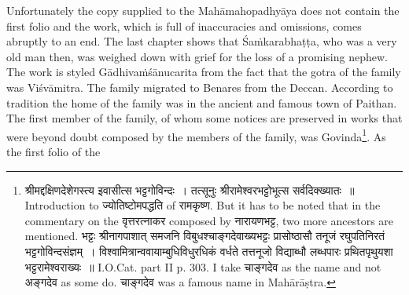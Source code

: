 \documentclass[11pt, openany]{book}
\begin{document}
Unfortunately the copy supplied to the Mahāmahopadhyāya does not contain the first folio and the work, which is full of inaccuracies and omissions, comes abruptly to an end. The last chapter shows that Śaṁkarabhaṭṭa, who was a very old man then, was weighed down with grief for the loss of a promising nephew. The work is styled Gādhivaṁśānucarita from the fact that the gotra of the family was Viśvāmitra. The family migrated to Benares from the Deccan. According to tradition the home of the family was in the ancient and famous town of Paithan. The first member of the family, of whom some notices are preserved in works that were beyond doubt composed by the members of the family, was Govinda\renewcommand{\thefootnote}{1}\footnote{श्रीमद्दक्षिणदेशेगस्त्य इवासीत्स भट्टगोविन्दः~। तत्सूनुः श्रीरामेश्वरभट्टोभूत्स सर्वदिक्ख्यातः~॥ Introduction to ज्योतिष्टोमपद्धति of रामकृष्ण. But it has to be noted that in the commentary on the वृत्तरत्नाकर composed by नारायणभट्ट, two more ancestors are mentioned. {\qt भट्टः श्रीनागपाशात् समजनि विबुधश्चाङ्गदेवाख्यभट्टः प्रासोष्ठासौ तनूजं रघुपतिनिरतं भट्टगोविन्दसंज्ञम्~। विश्वामित्रान्ववायाम्बुधिविधुरधिकं वर्धते तत्तनूजो विद्याब्धौ लब्धपारः प्रथितपृथुयशा भट्टरामेश्वराख्यः~॥} I.O.Cat. part II p. 303. I take चाङ्गदेव as the name and not अङ्गदेव as some do. चाङ्गदेव was a famous name in Mahārāṣtra.}. As the first folio of the


\newpage
\end{document}
